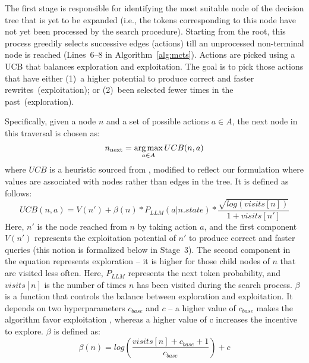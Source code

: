 %
The first stage is responsible for identifying the most suitable node of the decision tree that is yet to be expanded (i.e., the tokens corresponding to this node have not yet been processed by the search procedure).
%
Starting from the root, this process greedily selects successive edges (actions) till an unprocessed non-terminal node is reached (Lines~6--8 in Algorithm~\ref{alg:mcts}). Actions are picked using a UCB that balances exploration and exploitation. The goal is to pick those actions that have either (1)~a higher potential to produce correct and faster rewrites~(exploitation); or (2)~been selected fewer times in the past~(exploration). 
%

Specifically, given a node $n$ and a set of possible actions $a \in A$, the next node in this traversal is chosen as:
\begin{equation}
n_{\text{next}} = \operatorname*{arg\,max}_{a \in A} UCB(n, a)    
\end{equation}
where $UCB$ is a heuristic sourced from \cite{ucb}, modified to reflect our formulation where values are associated with nodes rather than edges in the tree. It is defined as follows:
\begin{equation}
UCB(n, a) = V(n') + \beta(n) * P_{LLM}(a|n.state) * \frac{\sqrt{log(visits[n])}}{1 + visits[n']}
\end{equation}
Here, $n'$ is the node reached from $n$ by taking action $a$, and the first component $V(n')$ represents the exploitation potential of $n'$ to produce correct and faster queries (this notion is formalized below in Stage~3).
%
The second component in the equation represents exploration -- it is higher for those child nodes of $n$ that are visited less often. Here, $P_{LLM}$ represents the next token probability, and $visits[n]$ is the number of times $n$ has been visited during the search process.
%
\(\beta\) is a function that controls the balance between exploration and exploitation. It depends on two hyperparameters $c_{base}$ and $c$ -- a higher value of $c_{base}$ makes the algorithm favor exploitation
, whereas a higher value of c increases the incentive to explore. \(\beta\) is defined as:
\begin{equation}
\beta(n) =  log(\frac{visits[n] + c_{base} + 1}{c_{base}}) + c
\end{equation}

